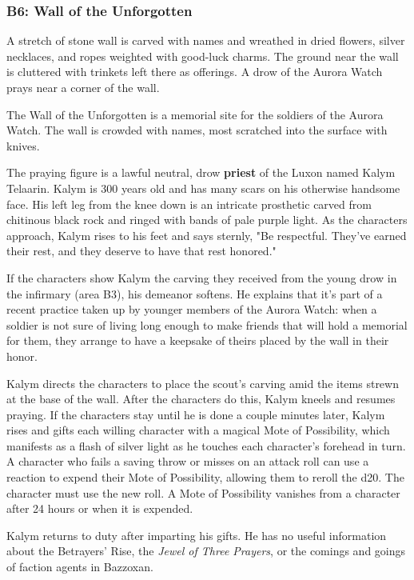 \documentclass[a4paper, 11pt, bg=full, twocolumn, nooutline]{dndbook}
\begin{document}
\subsubsection{B6: Wall of the Unforgotten}

\begin{DndReadAloud}
A stretch of stone wall is carved with names and wreathed in dried flowers, silver necklaces, and ropes weighted with good-luck charms. The ground near the wall is cluttered with trinkets left there as offerings. A drow of the Aurora Watch prays near a corner of the wall.
\end{DndReadAloud}

The Wall of the Unforgotten is a memorial site for the soldiers of the Aurora Watch. The wall is crowded with names, most scratched into the surface with knives.

The praying figure is a lawful neutral, drow \textbf{priest} of the Luxon named Kalym Telaarin. Kalym is 300 years old and has many scars on his otherwise handsome face. His left leg from the knee down is an intricate prosthetic carved from chitinous black rock and ringed with bands of pale purple light. As the characters approach, Kalym rises to his feet and says sternly, "Be respectful. They've earned their rest, and they deserve to have that rest honored."

If the characters show Kalym the carving they received from the young drow in the infirmary (area B3), his demeanor softens. He explains that it's part of a recent practice taken up by younger members of the Aurora Watch: when a soldier is not sure of living long enough to make friends that will hold a memorial for them, they arrange to have a keepsake of theirs placed by the wall in their honor.

Kalym directs the characters to place the scout's carving amid the items strewn at the base of the wall. After the characters do this, Kalym kneels and resumes praying. If the characters stay until he is done a couple minutes later, Kalym rises and gifts each willing character with a magical Mote of Possibility, which manifests as a flash of silver light as he touches each character's forehead in turn. A character who fails a saving throw or misses on an attack roll can use a reaction to expend their Mote of Possibility, allowing them to reroll the d20. The character must use the new roll. A Mote of Possibility vanishes from a character after 24 hours or when it is expended.

Kalym returns to duty after imparting his gifts. He has no useful information about the Betrayers' Rise, the \textit{Jewel of Three Prayers}, or the comings and goings of faction agents in Bazzoxan.
\end{document}
